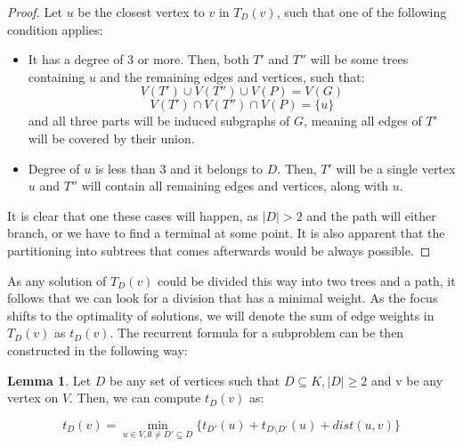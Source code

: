 \documentclass[thesis=M,english,hidelinks]{FITthesis}[2012/10/20]
\theoremstyle{definition}
\newtheorem{lemma}{Lemma}
\begin{document}
\begin{proof}
    Let $u$ be the closest vertex to $v$ in $T_D(v)$, such that one of the following condition applies:
    \begin{itemize}
        \item It has a degree of 3 or more. Then, both $T'$ and $T''$ will be some trees containing $u$ and
            the remaining edges and vertices, such that:
            $$
            V(T') \cup V(T'') \cup V(P) = V(G)
            $$ $$
            V(T') \cap V(T'') \cap V(P) = \{u\}
            $$
            and all three parts will be induced subgraphs of $G$, meaning all edges of $T'$ will be covered by
            their union.
        \item Degree of $u$ is less than 3 and it belongs to $D$. Then, $T'$ will be a single vertex $u$ and
            $T''$ will contain all remaining edges and vertices, along with $u$.
    \end{itemize}

    It is clear that one these cases will happen, as $|D| > 2$ and the path will either branch, or we have to find a
    terminal at some point. It is also apparent that the partitioning into subtrees that comes afterwards would be
    always possible.
\end{proof}

As any solution of $T_D(v)$ could be divided this way into two trees and a path, it follows that we can look for a
division that has a minimal weight. As the focus shifts to the optimality of solutions, we will denote the sum of edge
weights in $T_D(v)$ as $t_D(v)$. The recurrent formula for a subproblem can be then constructed in the following way:


\begin{lemma}
    \label{dw:formula}
    Let $D$ be any set of vertices such that $D \subseteq K, |D| \geq 2$ and v be any vertex on $V$. Then, we can
    compute $t_D(v)$ as:

    $$
    t_D(v) = \min_{u \in V, \emptyset \neq D' \subsetneq D} \{ t_{D'}(u) + t_{D \setminus D'}(u) + dist(u, v) \}
    $$
\end{lemma}
\end{document}
